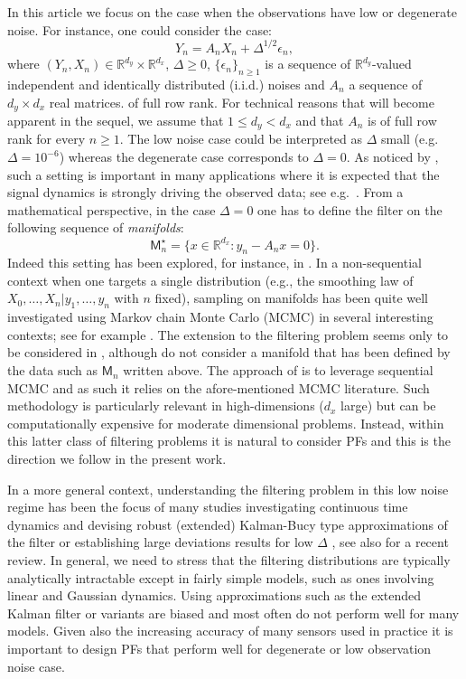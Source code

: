 \documentclass[english,13pt]{article}
\numberwithin{equation}{section}
\begin{document}
In this article we focus on the case when the observations have low or degenerate noise.  For instance, one could consider the case:
%
\begin{equation}
\label{eq:add_noise_ex}
Y_n = A_n X_n + \Delta^{1/2}\epsilon_n,
\end{equation}
%
where $(Y_n,X_n)\in\mathbb{R}^{d_y}\times\mathbb{R}^{d_x}$,  $\Delta\geq 0$, 
$\{\epsilon_n\}_{n\geq 1}$ is a sequence of $\mathbb{R}^{d_y}$-valued independent and identically distributed (i.i.d.) noises and $A_n$ a sequence of $d_y\times d_x$ real matrices.
 of full row rank.
For technical reasons that will become apparent in the sequel, we assume that $1\leq d_y<d_x$ and that $A_n$ is of full row rank for every $n\ge 1$.
The low noise case could be interpreted as $\Delta$ small (e.g.~$\Delta=10^{-6}$) whereas the  degenerate case corresponds to $\Delta=0$.  As noticed by \cite{zhu},  such a setting is
important in many applications  where it is expected that the signal dynamics is strongly driving the observed data; see e.g.~\cite{app1,app2}.  From a mathematical perspective,  in the case $\Delta=0$ one has to define the filter on the following sequence of \emph{manifolds}:
%
\begin{equation*}
\mathsf{M}^\star_n=\{x\in\mathbb{R}^{d_x}:y_n-A_nx=0\}.
\end{equation*}
%
 Indeed this setting has been explored,  for instance,  in \cite{zhu}.  In a non-sequential context when one targets a single distribution (e.g., the smoothing law of $X_0,\dots,X_n|y_1,\dots,y_n$ with $n$ fixed), sampling on manifolds has been quite well investigated using Markov chain Monte Carlo (MCMC) in several interesting contexts; see for example
\cite{bhar,byrne,graham_st,graham,zappa}. The extension to the filtering problem seems only to be considered in \cite{zhang,zhu},  although \cite{zhang} do not consider a manifold that has been defined by the data such as $\mathsf{M}_n$ written above.  The approach of \cite{zhu} is to leverage sequential MCMC and as such it relies on the afore-mentioned MCMC literature.  Such methodology is particularly relevant in high-dimensions ($d_x$ large) but can be computationally expensive for moderate dimensional problems. Instead, within this latter class of filtering problems it is natural to consider PFs and this is the direction we follow in the present work.

 In a more general context, understanding the filtering problem in this low noise regime has been the focus of many studies investigating continuous time dynamics and devising robust (extended) Kalman-Bucy type approximations of the filter \cite{brigo,katzur, milheiro, picard1, picard2} or establishing large deviations results for low $\Delta$  \cite{hijab,pardoux}, see also \cite{kutoyants} for a recent review. In general, we need to stress that the filtering distributions are typically analytically intractable except in fairly simple models,  such as ones involving linear and Gaussian dynamics.  Using approximations such as the extended Kalman filter or variants are biased and most often do not perform well for many models. Given also the increasing accuracy of many sensors used in practice it is important to design PFs that perform well for degenerate or low observation noise case.
\end{document}
